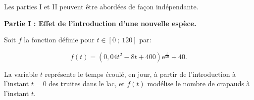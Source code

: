 
\medskip

%
Les parties I et II peuvent être abordées de façon indépendante.

\begin{center}\textbf{Partie I : Effet de l'introduction d'une nouvelle espèce.}\end{center}

%

Soit $f$ la fonction définie pour   $t \in [0~;~120]$ par:

\[f(t) = \left(0,04t^2 - 8t + 400\right)\text{e}^{\frac{t}{50}} + 40.\]

La variable $t$ représente le temps écoulé, en jour, à partir de l'introduction à l'instant $t = 0$ des truites dans le lac, et $f(t)$ modélise le nombre de crapauds à l'instant $t$.

\medskip

